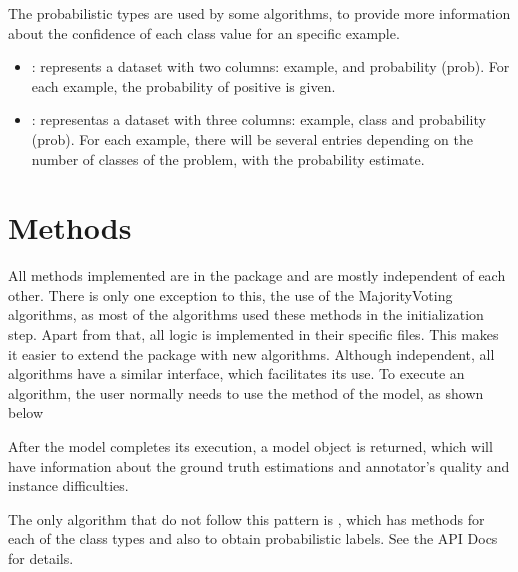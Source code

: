 \documentclass[letterpaper,10pt,english]{sphinxmanual}
\begin{document}
The probabilistic types are used by some algorithms, to provide more information about the confidence of each
class value for an specific example.
\begin{itemize}
\item {} 
: represents a dataset with two columns: example, and probability (prob). For each example, the probability
of positive is given.

\item {} 
: representas a dataset with three columns: example, class and probability (prob). For each example, there will be
several entries depending on the number of classes of the problem, with the probability estimate.

\end{itemize}


\section{Methods}
\label{\detokenize{package/design:methods}}
All methods implemented are in the  package and are mostly independent of each other. There is only one exception to this, the
use of the MajorityVoting algorithms, as most of the algorithms used these methods in the initialization step. Apart from that, all logic
is implemented in their specific files.  This makes it easier to extend the package with new algorithms. Although independent, all algorithms have
a similar interface, which facilitates its use. To execute an algorithm, the user normally needs to use the  method of the model, as shown below

%
\begin{sphinxVerbatim}[commandchars=\\\{\}]
   
\end{sphinxVerbatim}

After the model completes its execution, a model object is returned, which will have information about the ground truth estimations and
annotator’s quality and instance difficulties.

The only algorithm that do not follow this pattern is , which has methods for each of the class types and also to obtain
probabilistic labels. See the API Docs for details.
\end{document}
